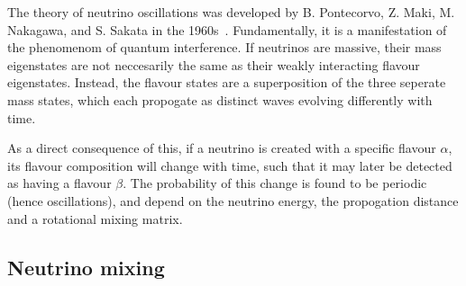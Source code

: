 The theory of neutrino oscillations was developed by B. Pontecorvo, Z. Maki, M. Nakagawa, and
S. Sakata in the 1960s~\cite{maki1962, pontecorvo1967, pontecorvo1969}. Fundamentally, it is a
manifestation of the phenomenom of quantum interference. If neutrinos are massive, their mass
eigenstates are not neccesarily the same as their weakly interacting flavour eigenstates. Instead,
the flavour states are a superposition of the three seperate mass states, which each propogate as
distinct waves evolving differently with time.

As a direct consequence of this, if a neutrino is created with a specific flavour $\alpha$, its
flavour composition will change with time, such that it may later be detected as having a flavour
$\beta$. The probability of this change is found to be periodic (hence oscillations), and depend
on the neutrino energy, the propogation distance and a rotational mixing matrix.

\subsection{Neutrino mixing}

